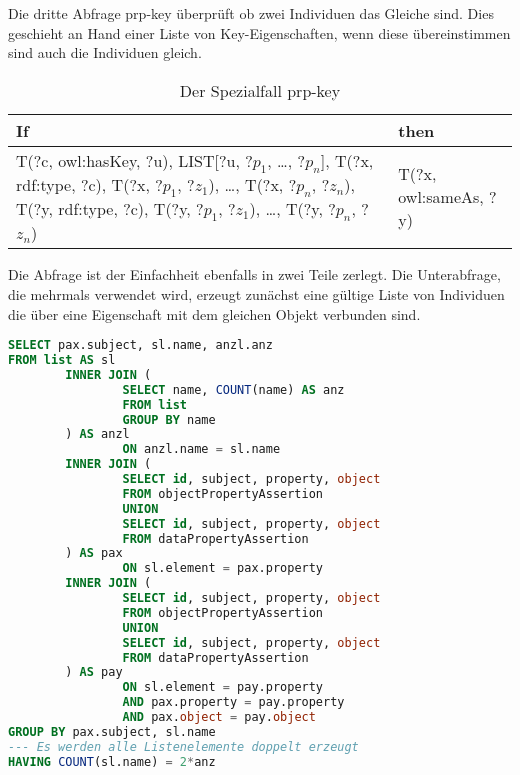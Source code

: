 Die dritte Abfrage prp-key überprüft ob zwei Individuen das Gleiche sind. Dies geschieht an Hand einer Liste  von Key-Eigenschaften, wenn diese übereinstimmen sind auch die Individuen gleich.
\begin{table}[htb]
\begin{center}
	\begin{tabular}{m{4.5cm}|m{4cm}}
	If & then \\ \hline
	T(?c, owl:hasKey, ?u),\newline
	LIST[?u, ?$p_1$, \ldots, ?$p_n$],\newline
	T(?x, rdf:type, ?c),\newline
	T(?x, ?$p_1$, ?$z_1$),\newline
	\ldots,\newline
	T(?x, ?$p_n$, ?$z_n$),\newline
	T(?y, rdf:type, ?c),\newline
	T(?y, ?$p_1$, ?$z_1$),\newline
	\ldots,\newline
	T(?y, ?$p_n$, ?$z_n$) & T(?x, owl:sameAs, ?y)
	\end{tabular}
\end{center}
	\caption{Der Spezialfall prp-key}
	\label{rule-prp-key}
\end{table}


Die Abfrage ist der Einfachheit ebenfalls in zwei Teile zerlegt. Die Unterabfrage, die mehrmals verwendet wird, erzeugt zunächst eine gültige Liste von Individuen die über eine Eigenschaft mit dem gleichen Objekt verbunden sind.
\begin{lstlisting}[language=SQL]
SELECT pax.subject, sl.name, anzl.anz
FROM list AS sl
        INNER JOIN (
                SELECT name, COUNT(name) AS anz
                FROM list
                GROUP BY name
        ) AS anzl
                ON anzl.name = sl.name
        INNER JOIN (
                SELECT id, subject, property, object
                FROM objectPropertyAssertion
                UNION
                SELECT id, subject, property, object
                FROM dataPropertyAssertion
        ) AS pax
                ON sl.element = pax.property
        INNER JOIN (
                SELECT id, subject, property, object
                FROM objectPropertyAssertion
                UNION
                SELECT id, subject, property, object
                FROM dataPropertyAssertion
        ) AS pay
                ON sl.element = pay.property
                AND pax.property = pay.property
                AND pax.object = pay.object
GROUP BY pax.subject, sl.name
--- Es werden alle Listenelemente doppelt erzeugt
HAVING COUNT(sl.name) = 2*anz
\end{lstlisting}

